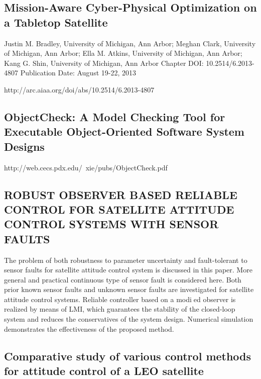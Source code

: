 \subsection{Mission-Aware Cyber-Physical Optimization on a Tabletop Satellite}


Justin M. Bradley, University of Michigan, Ann Arbor; Meghan Clark, University of Michigan, Ann Arbor; Ella M. Atkins, University of Michigan, Ann Arbor; Kang G. Shin, University of Michigan, Ann Arbor
Chapter DOI: 10.2514/6.2013-4807
Publication Date: August 19-22, 2013

http://arc.aiaa.org/doi/abs/10.2514/6.2013-4807

\subsection{ObjectCheck: A Model
Checking Tool for Executable Object-Oriented Software System
Designs}

http://web.cecs.pdx.edu/~xie/pubs/ObjectCheck.pdf

\subsection{ROBUST OBSERVER BASED RELIABLE CONTROL FOR SATELLITE
ATTITUDE CONTROL SYSTEMS WITH SENSOR FAULTS}

The problem of both robustness to parameter uncertainty and fault-tolerant
to sensor faults for satellite attitude control system is discussed in this paper. More
general and practical continuous type of sensor fault is considered here. Both prior known
sensor faults and unknown sensor faults are investigated for satellite attitude control
systems. Reliable controller based on a modied observer is realized by means of LMI,
which guarantees the stability of the closed-loop system and reduces the conservatives of
the system design. Numerical simulation demonstrates the effectiveness of the proposed
method.

\subsection{Comparative study of various control methods for attitude control of a LEO satellite}


